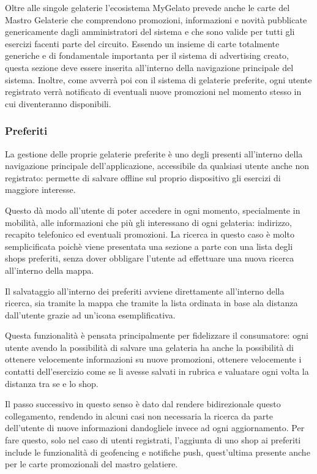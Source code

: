 Oltre alle singole gelaterie l'ecosistema MyGelato prevede anche le carte del Mastro Gelaterie che comprendono promozioni, informazioni e novità pubblicate genericamente dagli amministratori del sistema e che sono valide per tutti gli esercizi facenti parte del circuito.
Essendo un insieme di carte totalmente generiche e di fondamentale importanta per il sistema di advertising creato, questa sezione deve essere inserita all'interno della navigazione principale del sistema.
Inoltre, come avverrà poi con il sistema di gelaterie preferite, ogni utente registrato verrà notificato di eventuali nuove promozioni nel momento stesso in cui diventeranno disponibili.

\subsubsection{Preferiti}
La gestione delle proprie gelaterie preferite è uno degli presenti all'interno della navigazione principale dell'applicazione, accessibile da qualsiasi utente anche non registrato: permette di salvare offline sul proprio dispositivo gli esercizi di maggiore interesse.

Questo dà modo all'utente di poter accedere in ogni momento, specialmente in mobilità, alle informazioni che più gli interessano di ogni gelateria: indirizzo, recapito telefonico ed eventuali promozioni.
La ricerca in questo caso è molto semplicificata poichè viene presentata una sezione a parte con una lista degli shops preferiti, senza dover obbligare l'utente ad effettuare una nuova ricerca all'interno della mappa.

Il salvataggio all'interno dei preferiti avviene direttamente all'interno della ricerca, sia tramite la mappa che tramite la lista ordinata in base ala distanza dall'utente grazie ad un'icona esemplificativa.

Questa funzionalità è pensata principalmente per fidelizzare il consumatore: ogni utente avendo la possibilità di salvare una gelateria ha anche la possibilità di ottenere velocemente informazioni su nuove promozioni, ottenere velocemente i contatti dell'esercizio come se li avesse salvati in rubrica e valuatare ogni volta la distanza tra se e lo shop.

Il passo successivo in questo senso è dato dal rendere bidirezionale questo collegamento, rendendo in alcuni casi non necessaria la ricerca da parte dell'utente di nuove informazioni dandogliele invece ad ogni aggiornamento.
Per fare questo, solo nel caso di utenti registrati, l'aggiunta di uno shop ai preferiti include le funzionalità di geofencing e notifiche push, quest'ultima presente anche per le carte promozionali del mastro gelatiere.

